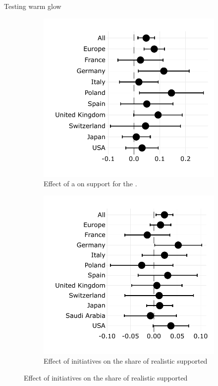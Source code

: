 \documentclass[aspectratio=169,xcolor=dvipsnames, 11pt,mathserif]{beamer}
\begin{document}
\begin{frame}{Testing warm glow} 
    \begin{figure}
\begin{subfigure}{.47\textwidth}
  \caption[]{Effect of a  on support for the .}
  \includegraphics[width=\textwidth]{../figures/country_comparison/gcs_support_by_variant_warm_glow.pdf}
\end{subfigure} \quad
\begin{subfigure}{.47\textwidth}
  \caption[]{Effect of  initiatives on the share of realistic  supported}
  \includegraphics[width=\textwidth]{../figures/country_comparison/share_solidarity_supported_by_info_solidarity.pdf}
\end{subfigure}
\end{figure}
\end{frame}
\end{document}
